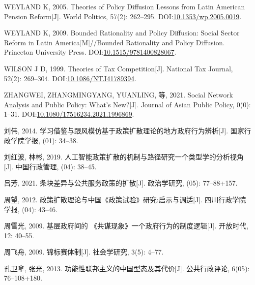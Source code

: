 \documentclass[
  12pt,
]{ctexart}
\newlength{\cslhangindent}
\newlength{\cslentryspacingunit} %
\newenvironment{CSLReferences}[2] %
 {%
  \setlength{\parindent}{0pt}
  \ifodd #1
  \let\oldpar\par
  \def\par{\hangindent=\cslhangindent\oldpar}
  \fi
  \setlength{\parskip}{#2\cslentryspacingunit}
 }%
 {}
\begin{document}
\begin{CSLReferences}{1}{0}
\leavevmode{}%
WEYLAND K, 2005. Theories of {Policy Diffusion Lessons} from {Latin American Pension Reform}{[}J{]}. World Politics, 57(2): 262--295. DOI:\href{https://doi.org/10.1353/wp.2005.0019}{10.1353/wp.2005.0019}.

\leavevmode{}%
WEYLAND K, 2009. Bounded {Rationality} and {Policy Diffusion}: {Social Sector Reform} in {Latin America}{[}M{]}//Bounded Rationality and Policy Diffusion. {Princeton University Press}. DOI:\href{https://doi.org/10.1515/9781400828067}{10.1515/9781400828067}.

\leavevmode{}%
WILSON J D, 1999. Theories of {Tax Competition}{[}J{]}. National Tax Journal, 52(2): 269--304. DOI:\href{https://doi.org/10.1086/NTJ41789394}{10.1086/NTJ41789394}.

\leavevmode{}%
ZHANGWEI, ZHANGMINGYANG, YUANLING, 等, 2021. Social Network Analysis and Public Policy: What's New?{[}J{]}. Journal of Asian Public Policy, 0(0): 1--31. DOI:\href{https://doi.org/10.1080/17516234.2021.1996869}{10.1080/17516234.2021.1996869}.

\leavevmode{}%
刘伟, 2014. {学习借鉴与跟风模仿\textemdash\textemdash 基于政策扩散理论的地方政府行为辨析}{[}J{]}. 国家行政学院学报, (01): 34--38.

\leavevmode{}%
刘红波, 林彬, 2019. {人工智能政策扩散的机制与路径研究\textemdash\textemdash 一个类型学的分析视角}{[}J{]}. 中国行政管理, (04): 38--45.

\leavevmode{}%
吕芳, 2021. {条块差异与公共服务政策的扩散}{[}J{]}. 政治学研究, (05): 77--88+157.

\leavevmode{}%
周望, 2012. {政策扩散理论与中国{《政策试验》}研究:启示与调适}{[}J{]}. 四川行政学院学报, (04): 43--46.

\leavevmode{}%
周雪光, 2009. 基层政府间的 {《共谋现象》}\textemdash\textemdash 一个政府行为的制度逻辑{[}J{]}. 开放时代, 12: 40--55.

\leavevmode{}%
周飞舟, 2009. 锦标赛体制{[}J{]}. 社会学研究, 3(5): 4--77.

\leavevmode{}%
孔卫拿, 张光, 2013. {功能性联邦主义的中国型态及其代价}{[}J{]}. 公共行政评论, 6(05): 76--108+180.


\end{CSLReferences}
\end{document}
